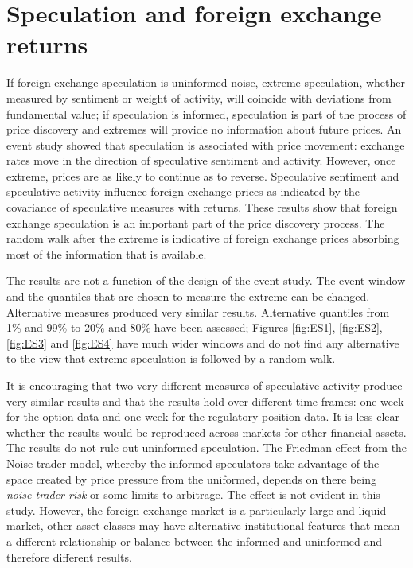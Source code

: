 \documentclass{article}
\begin{document}
\section{Speculation and foreign exchange returns}
If foreign exchange speculation is uninformed noise, extreme speculation, whether measured by sentiment or weight of activity, will coincide with deviations from fundamental value; if speculation is informed, speculation is part of the process of price discovery and extremes will provide no information about future prices. An event study showed that speculation is associated with price movement: exchange rates move in the direction of speculative sentiment and activity.  However, once extreme, prices are as likely to continue as to reverse. Speculative sentiment and speculative activity influence foreign exchange prices as indicated by the covariance of speculative measures with returns.  These results show that foreign exchange speculation is an important part of the price discovery process.  The random walk after the extreme is indicative of foreign exchange prices absorbing most of the information that is available.  
  
The results are not a function of the design of the event study.  The event window and the quantiles that are chosen to measure the extreme can be changed.  Alternative measures produced very similar results. Alternative quantiles from 1\% and 99\% to 20\% and 80\% have been assessed; Figures \ref{fig:ES1}, \ref{fig:ES2}, \ref{fig:ES3} and \ref{fig:ES4} have much wider windows and do not find any alternative to the view that extreme speculation is followed by a random walk. 


It is encouraging that two very different measures of speculative activity produce very similar results and that the results hold over different time frames: one week for the option data and one week for the regulatory position data.  It is less clear whether the results would be reproduced across markets for other financial assets. The results do not rule out uninformed speculation.  The Friedman effect from the Noise-trader model, whereby the informed speculators take advantage of the space created by price pressure from the uniformed, depends on there being \emph{noise-trader risk} or some limits to arbitrage.  The effect is not evident in this study.  However, the foreign exchange market is a particularly large and liquid market, other asset classes may have alternative institutional features that mean a different relationship or balance between the informed and uninformed and therefore different results.  
\end{document}

